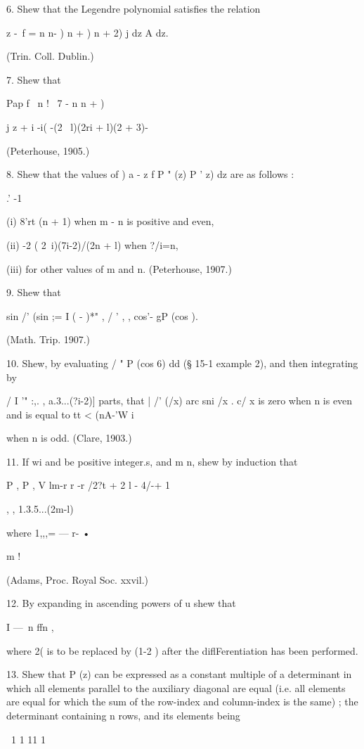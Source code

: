 {{{{6. Shew that the Legendre polynomial satisfies the relation

 z -\ f = n n- ) n + ) n + 2) j dz A dz.

(Trin. Coll. Dublin.)

7. Shew that

Pap f \ n ! \ 7 - n n + ) \

j z + i -i( -(2 \ l)(2ri + l)(2 + 3)-

(Peterhouse, 1905.)

8. Shew that the values of ) a - z f P " (z) P ' z) dz are as follows
:

.' -1

(i) 8'rt (n + 1) when m - n is positive and even,

(ii) -2 ( 2\ i)(7i-2)/(2n + l) when ?/i=n,

(iii) for other values of m and n. (Peterhouse, 1907.)

9. Shew that

sin /' (sin ;= I ( - )*" , / ' , , cos'- gP (cos ).

(Math. Trip. 1907.)

10. Shew, by evaluating / " P (cos 6) dd (§ 15-1 example 2), and then
integrating by

/ I '" :,. , a.3...(?i-2)] parts, that | /' (/x) arc sni /x . c/ x is
zero when n is even and is equal to tt < (nA-'W i

when n is odd. (Clare, 1903.)

11. If wi and be positive integer.s, and m n, shew by induction that

P , P , V lm-r r -r /2?t + 2 l - 4/-+ 1 \

, , 1.3.5...(2m-l)

where 1,,,= — r- •

m !

(Adams, Proc. Royal Soc. xxvil.)

12. By expanding in ascending powers of u shew that

I —\ n ffn ,

where 2( is to be replaced by (1-2 ) after the diflFerentiation has
been performed.

13. Shew that P (z) can be expressed as a constant multiple of a
determinant in which all elements parallel to the auxiliary diagonal
are equal (i.e. all elements are equal for which the sum of the
row-index and column-index is the same) ; the determinant containing n
rows, and its elements being

\ 1 1 11 1

}}}}
